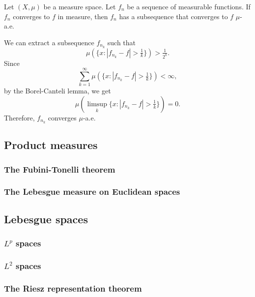 \documentclass{../note}
\begin{document}
\begin{thm}
Let $(X,\mu)$ be a measure space.
Let $f_n$ be a sequence of measurable functions.
If $f_n$ converges to $f$ in measure, then $f_n$ has a subsequence that converges to $f$ $\mu$-a.e.
\end{thm}
\begin{pf}
We can extract a subsequence $f_{n_k}$ such that
\[\mu(\{x:|f_{n_k}-f|>\tfrac1k\})>\tfrac1{2^k}.\]
Since
\[\sum_{k=1}^\infty\mu(\{x:|f_{n_k}-f|>\tfrac1k\})<\infty,\]
by the Borel-Canteli lemma, we get
\[\mu(\limsup_k\{x:|f_{n_k}-f|>\tfrac1k\})=0.\]
Therefore, $f_{n_k}$ converges $\mu$-a.e.
\end{pf}



\chapter{Product measures}
\section{The Fubini-Tonelli theorem}
\section{The Lebesgue measure on Euclidean spaces}

\chapter{Lebesgue spaces}
\section{$L^p$ spaces}
\section{$L^2$ spaces}
\section{The Riesz representation theorem}



\part{}

\chapter{}
\end{document}
